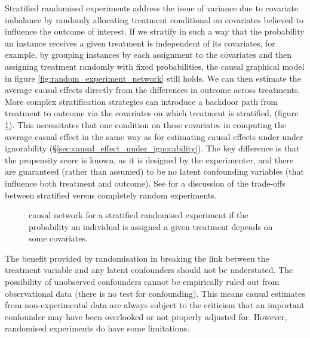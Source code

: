 \documentclass[11pt,a4paper,twoside]{report}
\theoremstyle{plain}
\theoremstyle{definition}
\begin{document}
Stratified randomised experiments address the issue of variance due to covariate imbalance by randomly allocating treatment conditional on covariates believed to influence the outcome of interest. If we stratify in such a way that the probability an instance receives a given treatment is independent of its covariates, for example, by grouping instances by each assignment to the covariates and then assigning treatment randomly with fixed probabilities, the causal graphical model in figure \ref{fig:random_experiment_network} still holds. We can then estimate the average causal effects directly from the differences in outcome across treatments. More complex stratification strategies can introduce a backdoor path from treatment to outcome via the covariates on which treatment is stratified, (figure \ref{fig:random_experiment_network_stratified}). This necessitates that one condition on these covariates in computing the average casual effect in the same way as for estimating causal effects under under ignorability (\S\ref{sec:causal_effect_under_ignorability}). The key difference is that the propensity score is known, as it is designed by the experimenter, and there are guaranteed (rather than assumed) to be no latent confounding variables (that influence both treatment and outcome). See \citet{imbens2015causal} for a discussion of the trade-offs between stratified versus completely random experiments. 

\begin{figure}
\centering
{}
\caption{causal network for a stratified randomised experiment if the probability an individual is assigned a given treatment depends on some covariates.}
\label{fig:random_experiment_network_stratified}
\end{figure} 

The benefit provided by randomisation in breaking the link between the treatment variable and any latent confounders should not be understated. The possibility of unobserved confounders cannot be empirically ruled out from observational data \citep{Pearl2000} (there is no test for confounding). This means causal estimates from non-experimental data are always subject to the criticism that an important confounder may have been overlooked or not properly adjusted for. However, randomised experiments do have some limitations. 
\end{document}

